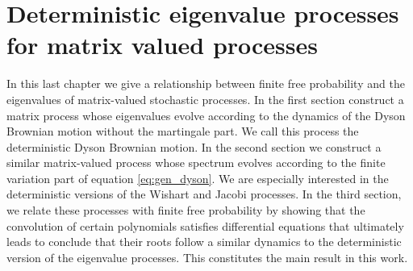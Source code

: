 \chapter{Deterministic eigenvalue processes for matrix valued processes}

In this last chapter we give a relationship between finite free probability and the eigenvalues of matrix-valued stochastic processes. In the first section construct a matrix process whose eigenvalues evolve according to the dynamics of the Dyson Brownian motion without the martingale part. We call this process the deterministic Dyson Brownian motion. In the second section we construct a similar matrix-valued process whose spectrum evolves according to the finite variation part of equation \eqref{eq:gen_dyson}. We are especially interested in the deterministic versions of the Wishart and Jacobi processes. In the third section, we relate these processes with finite free probability by showing that the convolution of certain polynomials satisfies differential equations that ultimately leads to conclude that their roots follow a similar dynamics to the deterministic version of the eigenvalue processes. This constitutes the main result in this work.

\label{ch:determinist}






